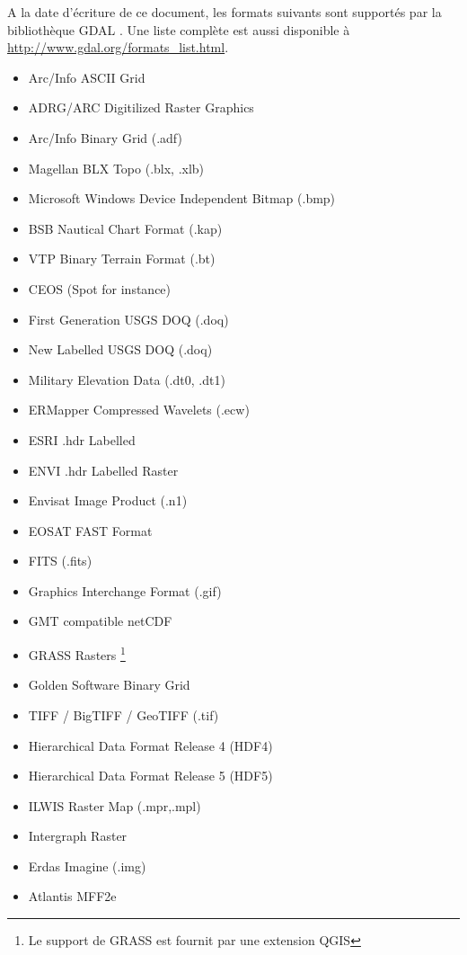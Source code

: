 A la date d'écriture de ce document, les formats suivants sont supportés par la bibliothèque GDAL \cite{GDALweb}. Une liste complète est aussi disponible à \url{http://www.gdal.org/formats_list.html}.
 
\begin{itemize}[label=--]
\item Arc/Info ASCII Grid
\item ADRG/ARC Digitilized Raster Graphics 
\item Arc/Info Binary Grid (.adf)
\item Magellan BLX Topo (.blx, .xlb)
\item Microsoft Windows Device Independent Bitmap (.bmp)
\item BSB Nautical Chart Format (.kap)
\item VTP Binary Terrain Format (.bt)
\item CEOS (Spot for instance)
\item First Generation USGS DOQ (.doq)
\item New Labelled USGS DOQ (.doq)
\item Military Elevation Data (.dt0, .dt1)
\item ERMapper Compressed Wavelets (.ecw)
\item ESRI .hdr Labelled
\item ENVI .hdr Labelled Raster
\item Envisat Image Product (.n1)
\item EOSAT FAST Format
\item FITS (.fits)
\item Graphics Interchange Format (.gif)
\item GMT compatible netCDF
\item GRASS Rasters \footnote{Le support de GRASS est fournit par une extension QGIS}
\item Golden Software Binary Grid
\item TIFF / BigTIFF / GeoTIFF (.tif)
\item Hierarchical Data Format Release 4 (HDF4)
\item Hierarchical Data Format Release 5 (HDF5)
\item ILWIS Raster Map (.mpr,.mpl)
\item Intergraph Raster
\item Erdas Imagine (.img)
\item Atlantis MFF2e

\end{itemize}
